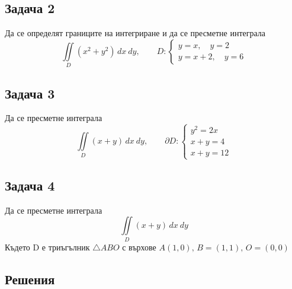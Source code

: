 \documentclass[a4paper,fleqn,12pt]{article}
\theoremstyle{definition}
\begin{document}
\subsection*{Задача 2}
Да се определят границите на интегриране и да се пресметне интеграла
$$\iint\limits_D (x^2 + y^2) \, dx \ dy, \qquad D: \begin{cases} y = x , \quad y =2 \\ y = x + 2, \quad y = 6 \end{cases}$$

\subsection*{Задача 3}
Да се пресметне интеграла
$$\iint\limits_D (x+y) \, dx \ dy, \qquad \partial D: \begin{cases} y^2 = 2x \\ x+y = 4 \\ x+y = 12 \end{cases}$$

\subsection*{Задача 4}
Да се пресметне интеграла
$$\iint\limits_D (x+y) \, dx \ dy$$
Където D е триъгълник $\triangle ABO$ с върхове $A(1,0),\, B = (1,1),\, O = (0,0)$

\newpage
\subsection{Решения}
\end{document}
